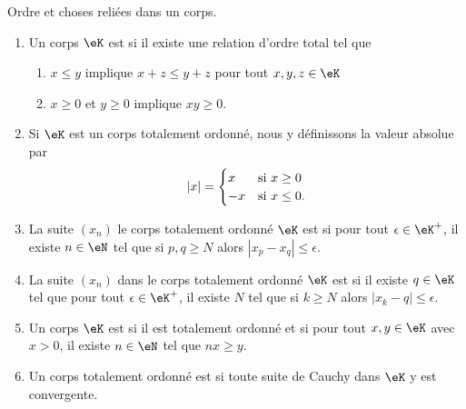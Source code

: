 \begin{definition}      \label{DefKCGBooLRNdJf}
    Ordre et choses reliées dans un corps.
    \begin{enumerate}
        \item
            Un corps \( \eK\) est  si il existe une relation d'ordre total tel que
            \begin{enumerate}
                \item
                    \( x\leq y\) implique \( x+z\leq y+z\) pour tout \( x,y,z\in \eK\)
                \item
                    \( x\geq 0\) et \( y\geq 0\) implique \( xy\geq 0\).
            \end{enumerate}
        \item
            Si \( \eK\) est un corps totalement ordonné, nous y définissons la valeur absolue par
            \begin{equation}
                | x |=\begin{cases}
                    x    &   \text{si $x\geq 0$}\\
                    -x    &    \text{si \( x\leq 0\)}.
                \end{cases}
            \end{equation}
        \item       \label{ItemVXOZooTYpcYN}
    La suite \( (x_n)\) le corps totalement ordonné \( \eK\) est  si pour tout \( \epsilon\in \eK^+\), il existe \( n\in \eN\) tel que si \( p,q\geq N\) alors \( | x_p-x_q |\leq \epsilon\).
        \item
    La suite \( (x_n)\) dans le corps totalement ordonné \( \eK\) est  si il existe \( q\in \eK\) tel que pour tout \( \epsilon\in \eK^+\), il existe \( N\) tel que si \( k\geq N\) alors \( | x_k-q |\leq \epsilon\).
\item   \label{ItemooDZQKooPsqeRf}
            Un corps \( \eK\) est  si il est totalement ordonné et si pour tout \( x,y\in \eK\) avec \( x>0\), il existe \( n\in \eN\) tel que \( nx\geq y\).
        \item
            Un corps totalement ordonné est  si toute suite de Cauchy dans \( \eK\) y est convergente.
    \end{enumerate}
\end{definition}

